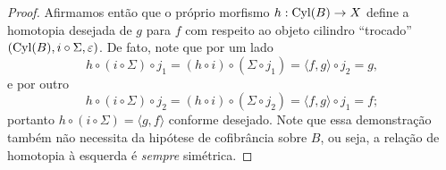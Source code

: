 \begin{proof}
  Afirmamos então que o próprio morfismo $h: \mathrm{Cyl}(B) \to X$ define a homotopia desejada de $g$ para $f$ com respeito ao objeto cilindro ``trocado'' $(\mathrm{Cyl}(B),i \circ \Sigma,\varepsilon)$.
  De fato, note que por um lado
  \begin{displaymath}
    h \circ (i \circ \Sigma) \circ j_{1}
    = (h \circ i) \circ (\Sigma \circ j_{1})
    = \langle f,g \rangle \circ j_{2}
    = g,
  \end{displaymath}
  e por outro
  \begin{displaymath}
    h \circ (i \circ \Sigma) \circ j_{2}
    = (h \circ i) \circ (\Sigma \circ j_{2})
    = \langle f,g \rangle \circ j_{1}
    = f;
  \end{displaymath}
  portanto $h \circ (i \circ \Sigma) = \langle g,f \rangle$ conforme desejado.
  Note que essa demonstração também não necessita da hipótese de cofibrância sobre $B$, ou seja, a relação de homotopia à esquerda é \emph{sempre} simétrica.


\end{proof}
